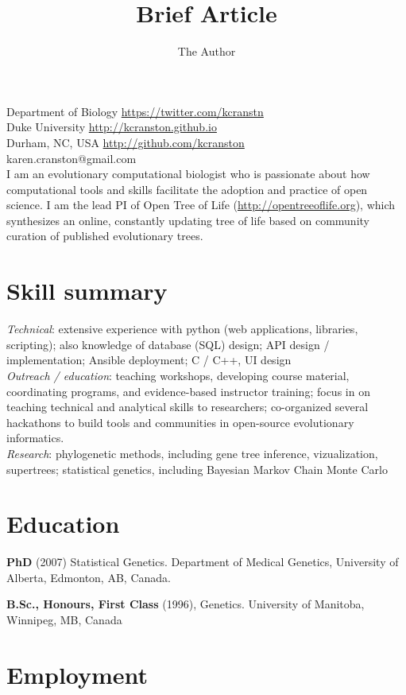 \documentclass[10pt]{article}
\title{Brief Article}
\author{The Author}
\begin{document}
\noindent Department of Biology \hfill \url{https://twitter.com/kcranstn} \\
Duke University  \hfill \url{http://kcranston.github.io} \\
Durham, NC, USA \hfill  \url{http://github.com/kcranston} \\
karen.cranston@gmail.com  \\

\vspace{0.4cm}
I am an evolutionary computational biologist who is passionate about how computational tools and skills facilitate the adoption and practice of open science. I am the lead PI of Open Tree of Life (\url{http://opentreeoflife.org}), which synthesizes an online, constantly updating tree of life based on community curation of published evolutionary trees. 

\section*{Skill summary}

\emph{Technical}: extensive experience with python (web applications, libraries, scripting); also knowledge of database (SQL) design; API design / implementation; Ansible deployment; C / C++, UI design \\

\emph{Outreach / education}: teaching workshops, developing course material, coordinating programs, and evidence-based instructor training; focus in on teaching technical and analytical skills to researchers; co-organized several hackathons to build tools and communities in open-source evolutionary informatics.\\ 

\emph{Research}: phylogenetic methods, including gene tree inference, vizualization, supertrees; statistical genetics, including Bayesian Markov Chain Monte Carlo\\

\section*{Education}
{\bf PhD} (2007) Statistical Genetics. Department of Medical Genetics, University of Alberta, Edmonton, AB, Canada. 

{\bf B.Sc., Honours, First Class} (1996), Genetics. University of Manitoba, Winnipeg, MB, Canada \\

\section*{Employment}
\end{document}
